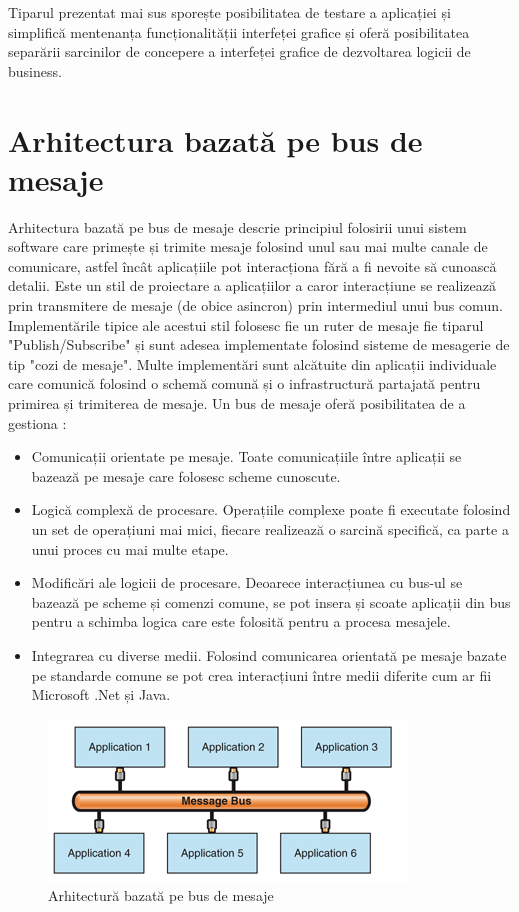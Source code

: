 \documentclass[12pt, a4paper, oneside, romanian]{teza-upb}
\begin{document}
Tiparul prezentat mai sus sporește posibilitatea de testare a aplicației și simplifică mentenanța funcționalității interfeței grafice și oferă posibilitatea separării sarcinilor de concepere a interfeței grafice de dezvoltarea logicii de business.

\section{Arhitectura bazată pe bus de mesaje}
Arhitectura bazată pe bus de mesaje descrie principiul folosirii unui sistem software care primește și trimite mesaje folosind unul sau mai multe canale de comunicare, astfel încât aplicațiile pot interacționa fără a fi nevoite să cunoască detalii. Este un stil de proiectare a aplicațiilor a caror interacțiune se realizează prin transmitere de mesaje (de obice asincron) prin intermediul unui bus comun. Implementările tipice ale acestui stil folosesc fie un ruter de mesaje fie tiparul "Publish/Subscribe" și sunt adesea implementate folosind sisteme de mesagerie de tip "cozi de mesaje". Multe implementări sunt alcătuite din aplicații individuale care comunică folosind o schemă comună și o infrastructură partajată pentru primirea și trimiterea de mesaje. Un bus de mesaje oferă posibilitatea de a gestiona :
\begin{itemize}
	\item Comunicații orientate pe mesaje.  Toate comunicațiile între aplicații se bazează pe mesaje care folosesc scheme cunoscute.
	\item Logică complexă de procesare. Operațiile complexe poate fi executate folosind un set de operațiuni mai mici, fiecare realizează o sarcină specifică, ca parte a unui proces cu mai multe etape.
	\item Modificări ale logicii de procesare. Deoarece interacțiunea cu bus-ul se bazează pe scheme și comenzi comune, se pot insera și scoate aplicații din bus pentru a schimba logica care este folosită pentru a procesa mesajele.
	\item Integrarea cu diverse medii. Folosind comunicarea orientată pe mesaje bazate pe standarde comune se pot crea interacțiuni între medii diferite cum ar fii Microsoft .Net și Java.
\end{itemize}

\begin{figure}[ht]
\centering
\includegraphics[scale=0.9]{img/message-bus.png}
\caption{Arhitectură bazată pe bus de mesaje}
\label{fig:arhi_componente}
\end{figure}
\end{document}
